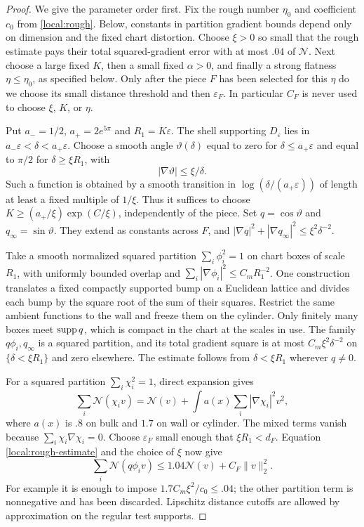 \begin{proof}
We give the parameter order first.  Fix the rough number $\eta_0$
and coefficient $c_0$ from \cref{local:rough}.  Below, constants in
partition gradient bounds depend only on dimension and the fixed
chart distortion.  Choose $\xi>0$ so small that the rough estimate
pays their total squared-gradient error with at most $.04$ of
$\mathcal N$.  Next choose a large fixed $K$, then a small fixed
$\alpha>0$, and finally a strong flatness $\eta\le\eta_0$, as
specified below.  Only after the piece $F$ has been selected for
this $\eta$ do we choose its small distance threshold and then
$\varepsilon_F$.  In particular $C_F$ is never used to choose
$\xi$, $K$, or $\eta$.

Put $a_-=1/2$, $a_+=2e^{5\pi}$ and $R_1=K\varepsilon$.
The shell supporting $D_\varepsilon$ lies in
$a_-\varepsilon<\delta<a_+\varepsilon$.
Choose a smooth angle $\vartheta(\delta)$ equal to zero for
$\delta\le a_+\varepsilon$ and equal to $\pi/2$ for
$\delta\ge\xi R_1$, with
\[
 |\nabla\vartheta|\le\xi/\delta.
\]
Such a function is obtained by a smooth transition in
$\log(\delta/(a_+\varepsilon))$ of length at least a fixed multiple
of $1/\xi$.  Thus it suffices to choose
$K\ge (a_+/\xi)\exp(C/\xi)$, independently of the piece.  Set
$q=\cos\vartheta$ and $q_\infty=\sin\vartheta$.
They extend as constants across $F$, and
$|\nabla q|^2+|\nabla q_\infty|^2\le\xi^2\delta^{-2}$.

Take a smooth normalized squared partition $\sum_i\phi_i^2=1$
on chart boxes of scale $R_1$, with uniformly bounded overlap and
$\sum_i|\nabla\phi_i|^2\le C_mR_1^{-2}$.
One construction translates a fixed compactly supported bump on a
Euclidean lattice and divides each bump by the square root of the
sum of their squares.  Restrict the same ambient functions to the
wall and freeze them on the cylinder.  Only finitely many boxes
meet $\operatorname{supp} q$, which is compact in the chart at the scales in use.
The family $q\phi_i,q_\infty$ is a squared partition, and its total
gradient square is at most $C_m\xi^2\delta^{-2}$ on
$\{\delta<\xi R_1\}$ and zero elsewhere.  The estimate follows
from $\delta<\xi R_1$ wherever $q\ne0$.

For a squared partition $\sum_i\chi_i^2=1$, direct expansion gives
\begin{equation}\label{local:IMS}
 \sum_i\mathcal N(\chi_iv)
 =\mathcal N(v)+
   \int a(x)\sum_i|\nabla\chi_i|^2v^2,
\end{equation}
where $a(x)$ is $.8$ on bulk and $1.7$ on wall or cylinder.
The mixed terms vanish because $\sum_i\chi_i\nabla\chi_i=0$.
Choose $\varepsilon_F$ small enough that $\xi R_1<d_F$.
Equation \eqref{local:rough-estimate} and the choice of $\xi$ now
give
\begin{equation}\label{local:localization}
 \sum_i\mathcal N(q\phi_iv)
 \le1.04\mathcal N(v)+C_F\|v\|_2^2.
\end{equation}
For example it is enough to impose
$1.7C_m\xi^2/c_0\le.04$; the other partition term is nonnegative
and has been discarded.  Lipschitz distance cutoffs are allowed by
approximation on the regular test supports.


\end{proof}

